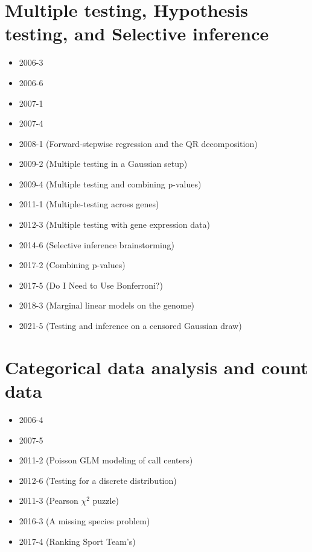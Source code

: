 \documentclass[12pt]{article}
\begin{document}
\section*{Multiple testing, Hypothesis testing, and Selective inference}
\begin{itemize}
\item 2006-3
\item 2006-6
\item 2007-1
\item 2007-4
\item 2008-1 (Forward-stepwise regression and the QR decomposition)
\item 2009-2 (Multiple testing in a Gaussian setup)
\item 2009-4 (Multiple testing and combining p-values)
\item 2011-1 (Multiple-testing across genes)
\item 2012-3 (Multiple testing with gene expression data)
\item 2014-6 (Selective inference brainstorming)
\item 2017-2 (Combining p-values)
\item 2017-5 (Do I Need to Use Bonferroni?)
\item 2018-3 (Marginal linear models on the genome)
\item 2021-5 (Testing and inference on a censored Gaussian draw)
\end{itemize}

\section*{Categorical data analysis and count data}
\begin{itemize}
\item 2006-4
\item 2007-5
\item 2011-2 (Poisson GLM modeling of call centers)
\item 2012-6 (Testing for a discrete distribution)
\item 2011-3 (Pearson $\chi^2$ puzzle)
\item 2016-3 (A missing species problem)
\item 2017-4 (Ranking Sport Team's)
\end{itemize}
\end{document}
